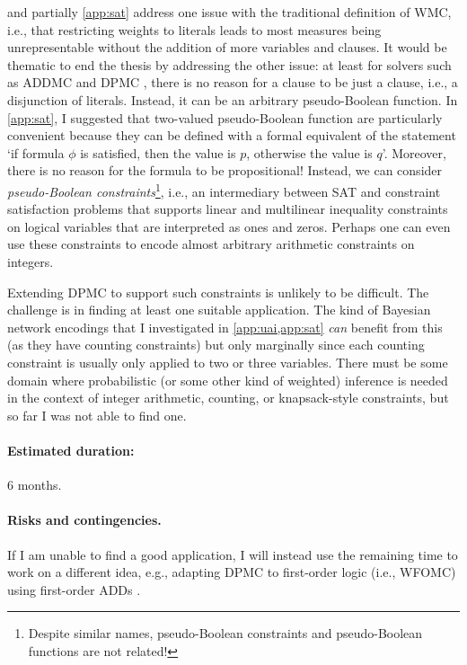 \documentclass{article}
\begin{document}
 and partially \cref{app:sat} address one issue with the
traditional definition of WMC, i.e., that restricting weights to literals leads
to most measures being unrepresentable without the addition of more variables
and clauses. It would be thematic to end the thesis by addressing the other
issue: at least for solvers such as ADDMC \cite{DBLP:conf/aaai/DudekPV20} and
DPMC \cite{DBLP:conf/cp/DudekPV20}, there is no reason for a clause to be just a
clause, i.e., a disjunction of literals. Instead, it can be an arbitrary
pseudo-Boolean function. In \cref{app:sat}, I suggested that two-valued
pseudo-Boolean function are particularly convenient because they can be defined
with a formal equivalent of the statement `if formula $\phi$ is satisfied, then
the value is $p$, otherwise the value is $q$'. Moreover, there is no reason for
the formula to be propositional! Instead, we can consider \emph{pseudo-Boolean
  constraints}\footnote{Despite similar names, pseudo-Boolean constraints and
  pseudo-Boolean functions are not related!}, i.e., an intermediary between SAT
and constraint satisfaction problems that supports linear and multilinear
inequality constraints on logical variables that are interpreted as ones and
zeros. Perhaps one can even use these constraints to encode almost arbitrary
arithmetic constraints on integers.

Extending DPMC to support such constraints is unlikely to be difficult. The
challenge is in finding at least one suitable application. The kind of Bayesian
network encodings that I investigated in \cref{app:uai,app:sat} \emph{can}
benefit from this (as they have counting constraints) but only marginally since
each counting constraint is usually only applied to two or three variables.
There must be some domain where probabilistic (or some other kind of weighted)
inference is needed in the context of integer arithmetic, counting, or
knapsack-style constraints, but so far I was not able to find one.

\paragraph{Estimated duration:} 6 months.

\paragraph{Risks and contingencies.} If I am unable to find a good
application, I will instead use the remaining time to work on a different idea,
e.g., adapting DPMC to first-order logic (i.e., WFOMC) using first-order ADDs
\cite{DBLP:journals/ai/SannerB09}.
\end{document}
